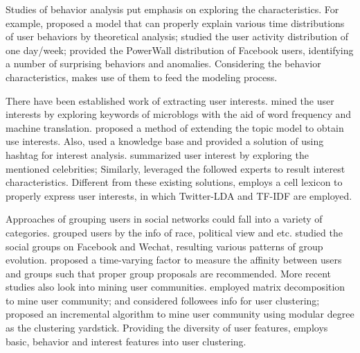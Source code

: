 Studies of behavior analysis put emphasis on exploring the characteristics.
For example, \cite{IEEEexample:jiang2013understanding} proposed a model that can properly explain various time distributions of user behaviors by theoretical analysis;
\cite{IEEEexample:conf/music/GuoLTL12} studied the user activity distribution of one day/week;
\cite{IEEEexample:journals/snam/DevineniKFF17} provided the PowerWall distribution of Facebook users, identifying a number of surprising behaviors and anomalies.
Considering the behavior characteristics, \sys{} makes use of them to feed the modeling process.

There have been established work of extracting user interests.
\cite{IEEEexample:journals/fcsc/LiuCS12} mined the user interests by exploring keywords of microblogs with the aid of word frequency and machine translation.
\cite{IEEEexample:conf/webi/XuLXY11} proposed a method of extending the topic model to obtain use interests.
Also, \cite{IEEEexample:conf/and/MichelsonM10} used a knowledge base and \cite{IEEEexample:conf/icde/FengW14} provided a solution of using hashtag for interest analysis.
\cite{IEEEexample:conf/wikis/LimD13} summarized user interest by exploring the mentioned celebrities;
Similarly, \cite{IEEEexample:conf/recsys/BhattacharyaZGGG14} leveraged the followed experts to result interest characteristics.
Different from these existing solutions, \sys{} employs a cell lexicon to properly express user interests, in which Twitter-LDA \cite{IEEEexample:zhao2011comparing} and TF-IDF are employed.

Approaches of grouping users in social networks could fall into a variety of categories.
\cite{IEEEexample:conf/icwsm/PennacchiottiP11} grouped users by the info of race, political view and etc.
\cite{IEEEexample:journals/tkdd/ZhangCFLYZY17} studied the social groups on Facebook and Wechat, resulting various patterns of group evolution.
\cite{IEEEexample:conf/aaai/WangDNGEB16} proposed a time-varying factor to measure the affinity between users and groups such that proper group proposals are recommended.
More recent studies also look into mining user communities.
\cite{IEEEexample:conf/wsdm/YangL13} employed matrix decomposition to mine user community;
\cite{IEEEexample:conf/www/RuanFP13} and \cite{IEEEexample:he2014overlapping} considered followees info for user clustering;
\cite{IEEEexample:conf/aaai/ShiokawaFO13} proposed an incremental algorithm to mine user community using modular degree as the clustering yardstick.
Providing the diversity of user features, \sys{} employs basic, behavior and interest features into user clustering.


